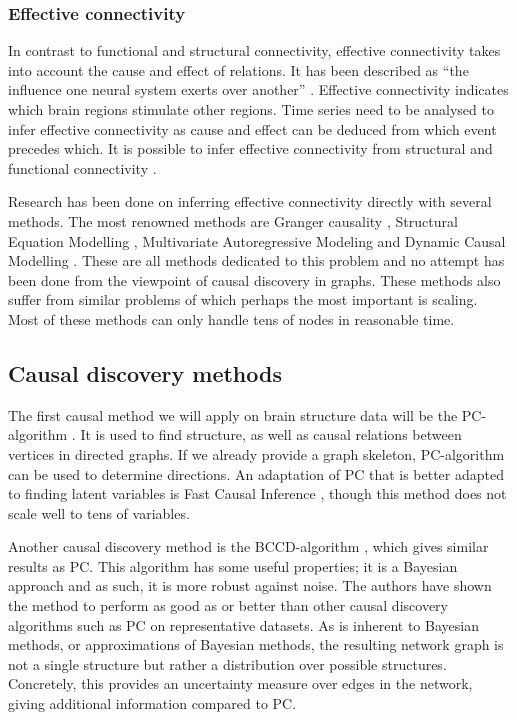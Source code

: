 \documentclass[a4paper, 10pt, english, twocolumn]{article}
\begin{document}
\subsubsection*{Effective connectivity}
In contrast to functional and structural connectivity, effective connectivity takes into account the cause and effect of relations.
It has been described as ``the influence one neural system exerts over another'' \cite{friston1994}.
Effective connectivity indicates which brain regions stimulate other regions.
Time series need to be analysed to infer effective connectivity as cause and effect can be deduced from which event precedes which. 
It is possible to infer effective connectivity from structural and functional connectivity \cite{mclntosh1994, harrison2003, friston2003, roebroeck2005}.

Research has been done on inferring effective connectivity directly with several methods.
The most renowned methods are Granger causality \cite{roebroeck2005}, Structural Equation Modelling \cite{mclntosh1994}, Multivariate Autoregressive Modeling \cite{harrison2003} and Dynamic Causal Modelling \cite{friston2003}.
These are all methods dedicated to this problem and no attempt has been done from the viewpoint of causal discovery in graphs.
These methods also suffer from similar problems of which perhaps the most important is scaling.
Most of these methods can only handle tens of nodes in reasonable time.

\subsection*{Causal discovery methods}
The first causal method we will apply on brain structure data will be the PC-algorithm \cite{spirtes2000}.
It is used to find structure, as well as causal relations between vertices in directed graphs. 
If we already provide a graph skeleton, PC-algorithm can be used to determine directions.
An adaptation of PC that is better adapted to finding latent variables is Fast Causal Inference \cite{spirtes2000}, though this method does not scale well to tens of variables.

Another causal discovery method is the BCCD-algorithm \cite{claassen2012}, which gives similar results as PC.
This algorithm has some useful properties; it is a Bayesian approach and as such, it is more robust against noise.
The authors have shown the method to perform as good as or better than other causal discovery algorithms such as PC on representative datasets.
As is inherent to Bayesian methods, or approximations of Bayesian methods, the resulting network graph is not a  single structure but rather a distribution over possible structures.
Concretely, this provides an uncertainty measure over edges in the network, giving additional information compared to PC.
\end{document}
